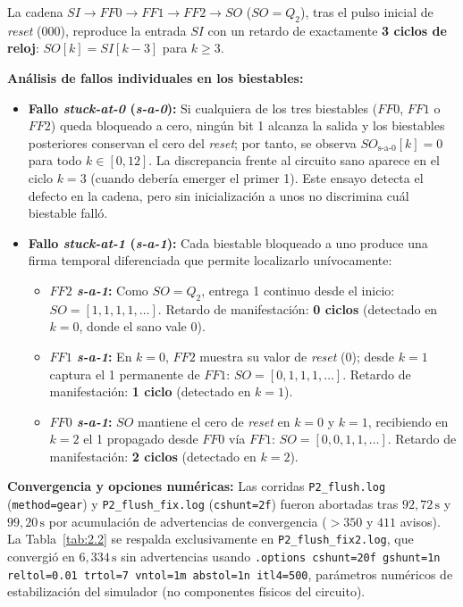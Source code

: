 \documentclass[10pt,a4paper]{article}
\begin{document}
La cadena $SI \to FF0 \to FF1 \to FF2 \to SO$ ($SO=Q_2$), tras el pulso inicial de \emph{reset} ($000$), reproduce la entrada $SI$ con un retardo de exactamente \textbf{3 ciclos de reloj}: $SO[k] = SI[k-3]$ para $k \ge 3$.

\textbf{Análisis de fallos individuales en los biestables:}
\begin{itemize}
  \item \textbf{Fallo \emph{stuck-at-0} (\emph{s-a-0}):} Si cualquiera de los tres biestables ($FF0$, $FF1$ o $FF2$) queda bloqueado a cero, ningún bit 1 alcanza la salida y los biestables posteriores conservan el cero del \emph{reset}; por tanto, se observa $SO_{\text{s-a-0}}[k] = 0$ para todo $k \in [0, 12]$. La discrepancia frente al circuito sano aparece en el ciclo $k=3$ (cuando debería emerger el primer 1). Este ensayo detecta el defecto en la cadena, pero sin inicialización a unos no discrimina cuál biestable falló.
  \item \textbf{Fallo \emph{stuck-at-1} (\emph{s-a-1}):} Cada biestable bloqueado a uno produce una firma temporal diferenciada que permite localizarlo unívocamente:
  \begin{itemize}
    \item \textbf{$FF2$ \emph{s-a-1}:} Como $SO=Q_2$, entrega 1 continuo desde el inicio: $SO = [1, 1, 1, 1, \dots]$. Retardo de manifestación: \textbf{0 ciclos} (detectado en $k=0$, donde el sano vale 0).
    \item \textbf{$FF1$ \emph{s-a-1}:} En $k=0$, $FF2$ muestra su valor de \emph{reset} ($0$); desde $k=1$ captura el 1 permanente de $FF1$: $SO = [0, 1, 1, 1, \dots]$. Retardo de manifestación: \textbf{1 ciclo} (detectado en $k=1$).
    \item \textbf{$FF0$ \emph{s-a-1}:} $SO$ mantiene el cero de \emph{reset} en $k=0$ y $k=1$, recibiendo en $k=2$ el 1 propagado desde $FF0$ vía $FF1$: $SO = [0, 0, 1, 1, \dots]$. Retardo de manifestación: \textbf{2 ciclos} (detectado en $k=2$).
  \end{itemize}
\end{itemize}

\textbf{Convergencia y opciones numéricas:} Las corridas \texttt{P2\_flush.log} (\texttt{method=gear}) y \texttt{P2\_flush\_fix.log} (\texttt{cshunt=2f}) fueron abortadas tras $92{,}72\,\mathrm{s}$ y $99{,}20\,\mathrm{s}$ por acumulación de advertencias de convergencia ($>350$ y $411$ avisos). La Tabla~\ref{tab:2.2} se respalda exclusivamente en \texttt{P2\_flush\_fix2.log}, que convergió en $6{,}334\,\mathrm{s}$ sin advertencias usando \texttt{.options cshunt=20f gshunt=1n reltol=0.01 trtol=7 vntol=1m abstol=1n itl4=500}, parámetros numéricos de estabilización del simulador (no componentes físicos del circuito).
\end{document}
